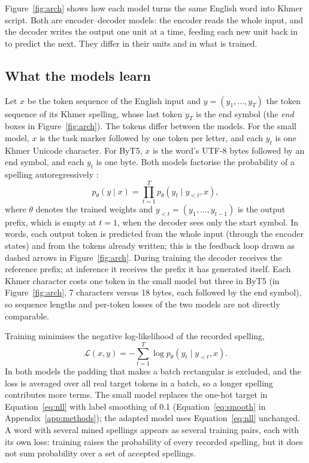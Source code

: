 \documentclass[10pt,a4paper,twocolumn]{article}
\begin{document}
Figure~\ref{fig:arch} shows how each model turns the same English word into Khmer script. Both are
encoder--decoder models: the encoder reads the whole input, and the decoder writes the output one unit at a time,
feeding each new unit back in to predict the next. They differ in their units and in what is trained.

\subsection{What the models learn}
\label{sec:objective}
Let $x$ be the token sequence of the English input and $y=(y_1,\dots,y_T)$ the token sequence of its Khmer
spelling, whose last token $y_T$ is the end symbol (the \emph{end} boxes in Figure~\ref{fig:arch}). The tokens
differ between the models. For the small model, $x$ is the task marker followed by one token per letter, and each
$y_t$ is one Khmer Unicode character. For ByT5, $x$ is the word's UTF-8 bytes followed by an end symbol, and each
$y_t$ is one byte. Both models factorise the probability of a spelling autoregressively
\citep{sutskever-etal-2014-sequence}:
\begin{equation}
  p_\theta(y\mid x)=\prod_{t=1}^{T} p_\theta(y_t\mid y_{<t},x),
  \label{eq:factor}
\end{equation}
where $\theta$ denotes the trained weights and $y_{<t}=(y_1,\dots,y_{t-1})$ is the output prefix, which is empty at
$t=1$, when the decoder sees only the start symbol. In words, each output token is predicted from the whole input
(through the encoder states) and from the tokens already written; this is the feedback loop drawn as dashed arrows
in Figure~\ref{fig:arch}. During training the decoder receives the reference prefix; at inference it receives the
prefix it has generated itself. Each Khmer character costs one token in the small model but three in ByT5 (in
Figure~\ref{fig:arch}, 7 characters versus 18 bytes, each followed by the end symbol), so sequence lengths and
per-token losses of the two models are not directly comparable.

Training minimises the negative log-likelihood of the recorded spelling,
\begin{equation}
  \mathcal{L}(x,y)=-\sum_{t=1}^{T}\log p_\theta(y_t\mid y_{<t},x).
  \label{eq:nll}
\end{equation}
In both models the padding that makes a batch rectangular is excluded, and the loss is averaged over all real
target tokens in a batch, so a longer spelling contributes more terms. The small model replaces the one-hot target
in Equation~\eqref{eq:nll} with label smoothing of 0.1 \citep{szegedy-etal-2016-rethinking}
(Equation~\eqref{eq:smooth} in Appendix~\ref{app:methods}); the adapted model uses Equation~\eqref{eq:nll}
unchanged. A word with several mined spellings appears as several training pairs, each with its own loss: training
raises the probability of every recorded spelling, but it does not sum probability over a set of accepted
spellings.
\end{document}
